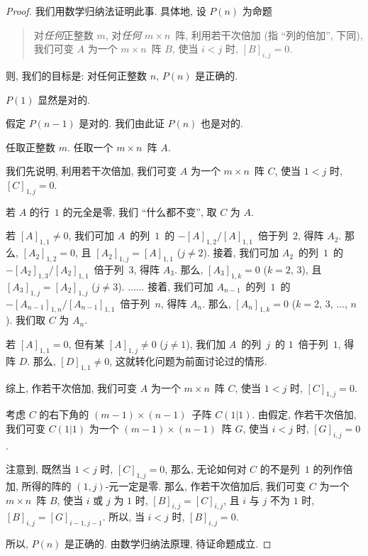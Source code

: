 \begin{proof}
    我们用数学归纳法证明此事.
    具体地, 设 \(P(n)\) 为命题
    \begin{quotation}
        对\emph{任何}正整数 \(m\),
        对\emph{任何} \(m \times n\)~阵,
        利用若干次倍加 (指 ``列的倍加'', 下同),
        我们可变 \(A\) 为一个 \(m \times n\)~阵 \(B\),
        使当 \(i < j\) 时,
        \([B]_{i,j} = 0\).
    \end{quotation}
    则, 我们的目标是:
    对任何正整数 \(n\), \(P(n)\) 是正确的.

    \(P(1)\) 显然是对的.

    假定 \(P(n-1)\) 是对的.
    我们由此证 \(P(n)\) 也是对的.

    任取正整数 \(m\).
    任取一个 \(m \times n\)~阵 \(A\).

    我们先说明, 利用若干次倍加,
    我们可变 \(A\) 为一个 \(m \times n\)~阵 \(C\),
    使当 \(1 < j\) 时, \([C]_{1,j} = 0\).

    若 \(A\) 的行~\(1\) 的元全是零,
    我们 ``什么都不变'',
    取 \(C\) 为 \(A\).

    若 \([A]_{1,1} \neq 0\),
    我们可加 \(A\)~的列~\(1\)~的
    \(-[A]_{1,2} / [A]_{1,1}\)~倍于列~\(2\),
    得阵 \(A_2\).
    那么, \([A_2]_{1,2} = 0\),
    且 \([A_2]_{1,j} = [A]_{1,1}\)
    (\(j \neq 2\)).
    接着, 我们可加 \(A_2\)~的列~\(1\)~的
    \(-[A_2]_{1,3} / [A_2]_{1,1}\)~倍于列~\(3\),
    得阵 \(A_3\).
    那么, \([A_3]_{1,k} = 0\)
    (\(k = 2\), \(3\)),
    且 \([A_3]_{1,j} = [A_2]_{1,j}\)
    (\(j \neq 3\)).
    \(\dots \dots\)
    接着, 我们可加 \(A_{n-1}\)~的列~\(1\)~的
    \(-[A_{n-1}]_{1,n} / [A_{n-1}]_{1,1}\)~倍于列~\(n\),
    得阵 \(A_n\).
    那么, \([A_n]_{1,k} = 0\)
    (\(k = 2\), \(3\), \(\dots\), \(n\)).
    我们取 \(C\) 为 \(A_n\).

    若 \([A]_{1,1} = 0\),
    但有某 \([A]_{1,j} \neq 0\)
    (\(j \neq 1\)),
    我们加 \(A\)~的列~\(j\)~的 \(1\)~倍于列~\(1\),
    得阵 \(D\).
    那么, \([D]_{1,1} \neq 0\),
    这就转化问题为前面讨论过的情形.

    综上, 作若干次倍加,
    我们可变 \(A\) 为一个 \(m \times n\)~阵 \(C\),
    使当 \(1 < j\) 时, \([C]_{1,j} = 0\).

    考虑 \(C\) 的右下角的 \((m-1) \times (n-1)\)~子阵
    \(C(1|1)\).
    由假定, 作若干次倍加, 我们可变 \(C(1|1)\) 为一个
    \((m-1) \times (n-1)\)~阵 \(G\),
    使当 \(i < j\) 时, \([G]_{i,j} = 0\).

    注意到, 既然当 \(1 < j\) 时, \([C]_{1,j} = 0\),
    那么, 无论如何对 \(C\) 的不是列~\(1\) 的列作倍加,
    所得的阵的 \((1, j)\)-元一定是零.
    那么, 作若干次倍加后,
    我们可变 \(C\) 为一个 \(m \times n\)~阵 \(B\),
    使当 \(i\) 或 \(j\) 为 \(1\) 时,
    \([B]_{i,j} = [C]_{i,j}\),
    且 \(i\) 与 \(j\) 不为 \(1\) 时,
    \([B]_{i,j} = [G]_{i-1,j-1}\).
    所以, 当 \(i < j\) 时, \([B]_{i,j} = 0\).

    所以, \(P(n)\) 是正确的.
    由数学归纳法原理, 待证命题成立.
\end{proof}

